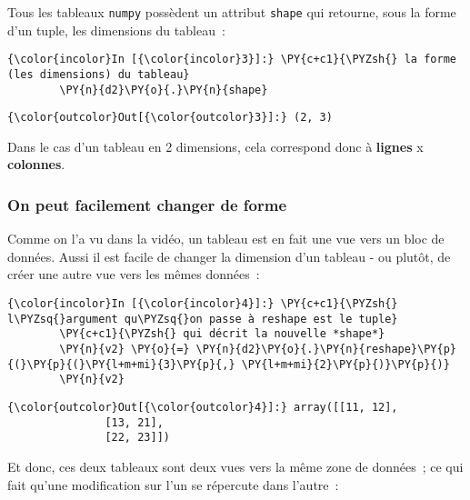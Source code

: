     Tous les tableaux \texttt{numpy} possèdent un attribut \texttt{shape}
qui retourne, sous la forme d'un tuple, les dimensions du tableau~:

    \begin{Verbatim}[commandchars=\\\{\}]
{\color{incolor}In [{\color{incolor}3}]:} \PY{c+c1}{\PYZsh{} la forme (les dimensions) du tableau}
        \PY{n}{d2}\PY{o}{.}\PY{n}{shape}
\end{Verbatim}


\begin{Verbatim}[commandchars=\\\{\}]
{\color{outcolor}Out[{\color{outcolor}3}]:} (2, 3)
\end{Verbatim}
            
    Dans le cas d'un tableau en 2 dimensions, cela correspond donc à
\textbf{lignes} x \textbf{colonnes}.

    \hypertarget{on-peut-facilement-changer-de-forme}{%
\subsubsection{On peut facilement changer de
forme}\label{on-peut-facilement-changer-de-forme}}

    Comme on l'a vu dans la vidéo, un tableau est en fait une vue vers un
bloc de données. Aussi il est facile de changer la dimension d'un
tableau - ou plutôt, de créer une autre vue vers les mêmes données~:

    \begin{Verbatim}[commandchars=\\\{\}]
{\color{incolor}In [{\color{incolor}4}]:} \PY{c+c1}{\PYZsh{} l\PYZsq{}argument qu\PYZsq{}on passe à reshape est le tuple}
        \PY{c+c1}{\PYZsh{} qui décrit la nouvelle *shape*}
        \PY{n}{v2} \PY{o}{=} \PY{n}{d2}\PY{o}{.}\PY{n}{reshape}\PY{p}{(}\PY{p}{(}\PY{l+m+mi}{3}\PY{p}{,} \PY{l+m+mi}{2}\PY{p}{)}\PY{p}{)}
        \PY{n}{v2}
\end{Verbatim}


\begin{Verbatim}[commandchars=\\\{\}]
{\color{outcolor}Out[{\color{outcolor}4}]:} array([[11, 12],
               [13, 21],
               [22, 23]])
\end{Verbatim}
            
    Et donc, ces deux tableaux sont deux vues vers la même zone de données~;
ce qui fait qu'une modification sur l'un se répercute dans l'autre~:

